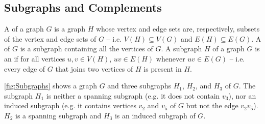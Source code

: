 \subsection{Subgraphs and Complements}\label{subsec:Subgraphs}

A  of a graph $G$ is a graph $H$ whose vertex and edge sets are, respectively, subsets of the vertex and edge sets of $G$ -- i.e. $V(H) \subseteq V(G)$ and $E(H) \subseteq E(G)$. A  of $G$ is a subgraph containing all the vertices of $G$. A subgraph $H$ of a graph $G$ is an  if for all vertices $u, v \in V(H)$, $uv \in E(H)$ whenever $uv \in E(G)$ -- i.e. every edge of $G$ that joins two vertices of $H$ is present in $H$.

\begin{Example}\label{ex:Subgraphs}
\cref{fig:Subgraphs} shows a graph $G$ and three subgraphs $H_1$, $H_2$, and $H_3$ of $G$. The subgraph $H_1$ is neither a spanning subgraph (e.g. it does not contain $v_3$), nor an induced subgraph (e.g. it contains vertices $v_2$ and $v_5$ of $G$ but not the edge $v_2 v_5$). $H_2$ is a spanning subgraph and $H_3$ is an induced subgraph of $G$.
\begin{figure}[!htbp]
\centering
{} \hfill

\end{figure}
\end{Example}
